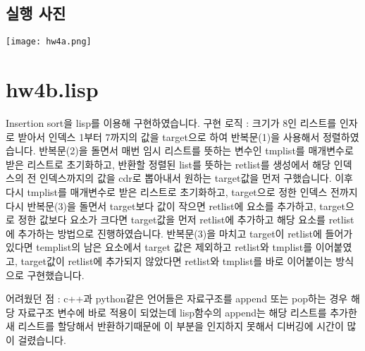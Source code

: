 \documentclass[11pt,oneside,a4paper]{article}
\begin{document}
\subsection{실행 사진}
\label{exPicture:hw4a}
\texttt{[image: hw4a.png]}

\section{hw4b.lisp}
Insertion sort을 lisp를 이용해 구현하였습니다.
구현 로직 : 크기가 8인 리스트를 인자로 받아서 인덱스 1부터 7까지의 값을 target으로 하여 반복문(1)을 사용해서 정렬하였습니다.
반복문(2)을 돌면서 매번 임시 리스트를 뜻하는 변수인 tmplist를 매개변수로 받은 리스트로 초기화하고, 반환할 정렬된 list를 뜻하는 retlist를 생성에서 해당 인덱스의 전 인덱스까지의 값을 cdr로 뽑아내서 원하는 target값을 먼저 구했습니다.
이후 다시 tmplist를 매개변수로 받은 리스트로 초기화하고, target으로 정한 인덱스 전까지 다시 반복문(3)을 돌면서 target보다 값이 작으면 retlist에 요소를 추가하고,
target으로 정한 값보다 요소가 크다면 target값을 먼저 retlist에 추가하고 해당 요소를 retlist에 추가하는 방법으로 진행하였습니다.
반복문(3)을 마치고 target이 retlist에 들어가있다면 templist의 남은 요소에서 target 값은 제외하고 retlist와 tmplist를 이어붙였고, 
target값이 retlist에 추가되지 않았다면 retlist와 tmplist를 바로 이어붙이는 방식으로 구현했습니다.

어려웠던 점 : c++과 python같은 언어들은 자료구조를 append 또는 pop하는 경우 해당 자료구조 변수에 바로 적용이 되었는데 
lisp함수의 append는 해당 리스트를 추가한 새 리스트를 할당해서 반환하기때문에 이 부분을 인지하지 못해서 디버깅에 시간이 많이 걸렸습니다.
\end{document}
